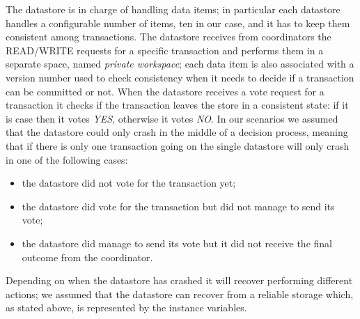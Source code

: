 The datastore is in charge of handling data items; in particular each datastore handles a configurable number of items, ten in our case, and it has to keep them consistent among transactions.
\newline
The datastore receives from coordinators the READ/WRITE requests for a specific transaction and performs them in a separate space, named \textit{private workspace}; each data item is also associated with a version number used to check consistency when it needs to decide if a transaction can be committed or not.
\newline
When the datastore receives a vote request for a transaction it checks if the transaction leaves the store in a consistent state: if it is case then it votes \textit{YES}, otherwise it votes \textit{NO}.
\newline
In our scenarios we assumed that the datastore could only crash in the middle of a decision process, meaning that if there is only one transaction going on the single datastore will only crash in one of the following cases:
\begin{itemize}
    \item the datastore did not vote for the transaction yet;
    \item the datastore did vote for the transaction but did not manage to send its vote;
    \item the datastore did manage to send its vote but it did not receive the final outcome from the coordinator.
\end{itemize}
Depending on when the datastore has crashed it will recover performing different actions; we assumed that the datastore can recover from a reliable storage which, as stated above, is represented by the instance variables.